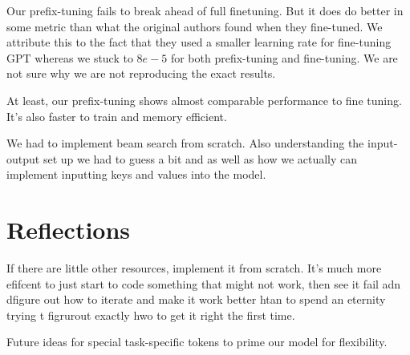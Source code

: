 \documentclass[11pt]{article} %
\begin{document}
Our prefix-tuning fails to break ahead of full finetuning. But it does do better in some metric than what the original authors found when they fine-tuned. We attribute this to the fact that they used a smaller learning rate for fine-tuning GPT whereas we stuck to $8e-5$ for both prefix-tuning and fine-tuning. We are not sure why we are not reproducing the exact results.

At least, our prefix-tuning shows almost comparable performance to fine tuning. It's also faster to train and memory efficient.

We had to implement beam search from scratch. Also understanding the input-output set up we had to guess a bit and as well as how we actually can implement inputting keys and values into the model.

\section{Reflections}

If there are little other resources, implement it from scratch. It's much more efifcent to just start to code something that might not work, then see it fail adn dfigure out how to iterate and make it work better htan to spend an eternity trying t figrurout exactly hwo to get it right the first time. 

Future ideas for special task-specific tokens to prime our model for flexibility.


\end{document}
